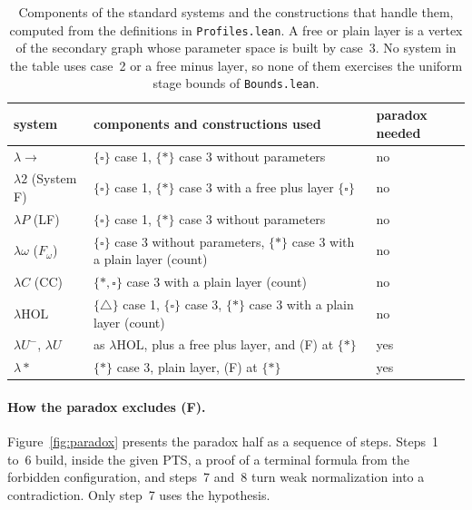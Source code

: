 \documentclass[10pt]{article}
\begin{document}
\begin{table}[H]
\centering\small
\begin{tabular}{lll}
\toprule
system & components and constructions used & paradox needed\\
\midrule
$\lambda{\to}$ & $\{\square\}$ case 1, $\{*\}$ case 3 without parameters & no\\
$\lambda 2$ (System F) & $\{\square\}$ case 1, $\{*\}$ case 3 with a free plus layer $\{\square\}$ & no\\
$\lambda P$ (LF) & $\{\square\}$ case 1, $\{*\}$ case 3 without parameters & no\\
$\lambda\omega$ ($F_\omega$) & $\{\square\}$ case 3 without parameters, $\{*\}$ case 3 with a plain layer (count) & no\\
$\lambda C$ (CC) & $\{*,\square\}$ case 3 with a plain layer (count) & no\\
$\lambda\mathrm{HOL}$ & $\{\triangle\}$ case 1, $\{\square\}$ case 3, $\{*\}$ case 3 with a plain layer (count) & no\\
$\lambda U^-$, $\lambda U$ & as $\lambda\mathrm{HOL}$, plus a free plus layer, and (F) at $\{*\}$ & yes\\
$\lambda{*}$ & $\{*\}$ case 3, plain layer, (F) at $\{*\}$ & yes\\
\bottomrule
\end{tabular}
\caption{Components of the standard systems and the constructions that handle them,
computed from the definitions in \texttt{Profiles.lean}. A free or plain layer is a
vertex of the secondary graph whose parameter space is built by case~3. No system in
the table uses case~2 or a free minus layer, so none of them exercises the uniform
stage bounds of \texttt{Bounds.lean}.}
\label{tab:systems}
\end{table}

\paragraph{How the paradox excludes (F).} Figure~\ref{fig:paradox} presents the
paradox half as a sequence of steps. Steps~1 to~6 build, inside the given PTS, a
proof of a terminal formula from the forbidden configuration, and steps~7 and~8 turn
weak normalization into a contradiction. Only step~7 uses the hypothesis.
\end{document}
